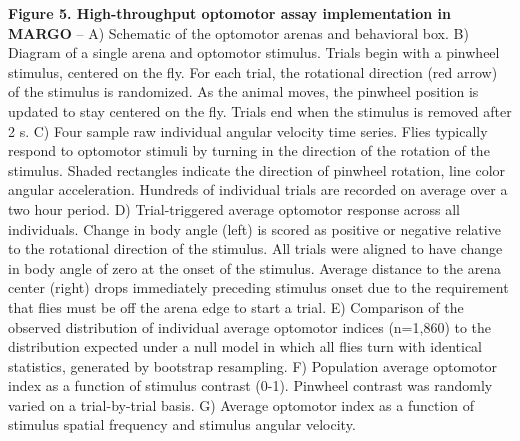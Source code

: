 \documentclass[10pt,letterpaper]{article}
\begin{document}
\clearpage
\textbf{Figure 5. High-throughput optomotor assay implementation in MARGO} -- A) Schematic of the optomotor arenas and behavioral box. B) Diagram of a single arena and optomotor stimulus. Trials begin with a pinwheel stimulus, centered on the fly. For each trial, the rotational direction (red arrow) of the stimulus is randomized. As the animal moves, the pinwheel position is updated to stay centered on the fly. Trials end when the stimulus is removed after 2 s. C) Four sample raw individual angular velocity time series. Flies typically respond to optomotor stimuli by turning in the direction of the rotation of the stimulus. Shaded rectangles indicate the direction of pinwheel rotation, line color angular acceleration. Hundreds of individual trials are recorded on average over a two hour period. D) Trial-triggered average optomotor response across all individuals. Change in body angle (left) is scored as positive or negative relative to the rotational direction of the stimulus. All trials were aligned to have change in body angle of zero at the onset of the stimulus. Average distance to the arena center (right) drops immediately preceding stimulus onset due to the requirement that flies must be off the arena edge to start a trial. E) Comparison of the observed distribution of individual average optomotor indices (n=1,860) to the distribution expected under a null model in which all flies turn with identical statistics, generated by bootstrap resampling. F) Population average optomotor index as a function of stimulus contrast (0-1). Pinwheel contrast was randomly varied on a trial-by-trial basis. G) Average optomotor index as a function of stimulus spatial frequency and stimulus angular velocity.
\end{document}
